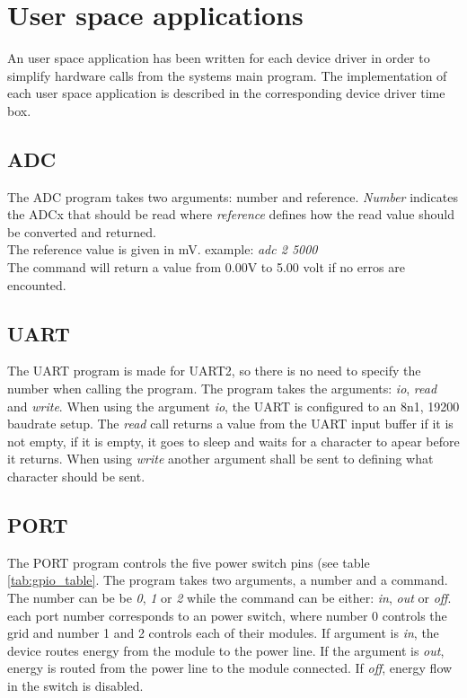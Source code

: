 \section{User space applications}
An user space application has been written for each device driver in order to simplify hardware calls from the systems main program. The implementation of each user space application is described in the corresponding device driver time box. 
\subsection{ADC}
The ADC program takes two arguments: number and reference. \textit{Number} indicates the ADCx that should be read where \textit{reference} defines how the read value should be converted and returned. 
\\The reference value is given in mV.
\p example: \textit{adc 2 5000}
\\The command will return a value from 0.00V to 5.00 volt if no erros are encounted. 
\subsection{UART}
The UART program is made for UART2, so there is no need to specify the number when calling the program. The program takes the arguments: \textit{io}, \textit{read} and \textit{write}. When using the argument \textit{io}, the UART is configured to an 8n1, 19200 baudrate setup. The \textit{read} call returns a value from the UART input buffer if it is not empty, if it is empty, it goes to sleep and waits for a character to apear before it returns. When using \textit{write} another argument shall be sent to defining what character should be sent.
\subsection{PORT}
The PORT program controls the five power switch pins (see table \ref{tab:gpio_table}. The program takes two arguments, a number and a command. The number can be be \textit{0}, \textit{1} or \textit{2} while the command can be either: \textit{in}, \textit{out} or \textit{off}.
\p each port number corresponds to an power switch, where number 0 controls the grid and number 1 and 2 controls each of their modules. 
\p If argument is \textit{in}, the device routes energy from the module to the power line. If the argument is \textit{out}, energy is routed from the power line to the module connected. If \textit{off}, energy flow in the switch is disabled.
